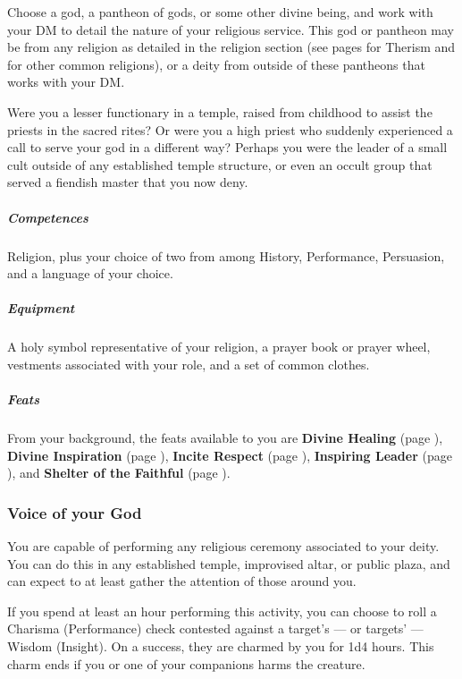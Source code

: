     Choose a god, a pantheon of gods, or some other divine being, and work with your DM to detail the nature of your religious service.
    This god or pantheon may be from any religion as detailed in the religion section (see pages \pageref{ssec::therism} for Therism and \pageref{ssec::religions} for other common religions), or a deity from outside of these pantheons that works with your DM.

    Were you a lesser functionary in a temple, raised from childhood to assist the priests in the sacred rites?
    Or were you a high priest who suddenly experienced a call to serve your god in a different way?
    Perhaps you were the leader of a small cult outside of any established temple structure, or even an occult group that served a fiendish master that you now deny.


    \subparagraph{Competences} Religion, plus your choice of two from among History, Performance, Persuasion, and a language of your choice.

    \subparagraph{Equipment} A holy symbol representative of your religion, a prayer book or prayer wheel, vestments associated with your role, and a set of common clothes.

    \subparagraph{Feats} From your background, the feats available to you are
    \textbf{Divine Healing} (page \pageref{feat::divinehealing}),
    \textbf{Divine Inspiration} (page \pageref{feat::divineinspiration}),
    \textbf{Incite Respect} (page \pageref{feat::inciterespect}),
    \textbf{Inspiring Leader} (page \pageref{feat::inspiringleader}), and
    \textbf{Shelter of the Faithful} (page \pageref{feat::shelterofthefaithful}).

    \subsubsection{Voice of your God} \label{feat::voiceofyourgod}
        You are capable of performing any religious ceremony associated to your deity.
        You can do this in any established temple, improvised altar, or public plaza, and can expect to at least gather the attention of those around you.

        If you spend at least an hour performing this activity, you can choose to roll a Charisma (Performance) check contested against a target's --- or targets' --- Wisdom (Insight).
        On a success, they are charmed by you for 1d4 hours.
        This charm ends if you or one of your companions harms the creature.

